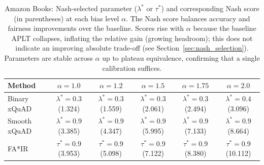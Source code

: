\begin{table}[htbp]
\centering
\caption{Amazon Books: Nash-selected parameter ($\lambda^*$ or $\tau^*$) and corresponding Nash score (in parentheses) at each bias level $\alpha$. The Nash score balances accuracy and fairness improvements over the baseline. Scores rise with $\alpha$ because the baseline APLT collapses, inflating the relative gain (growing headroom); this does not indicate an improving absolute trade-off (see Section~\ref{sec:nash_selection}). Parameters are stable across $\alpha$ up to plateau equivalence, confirming that a single calibration suffices.}
\label{tab:nash_selection_ab}
\begin{tabular}{lccccc}
\toprule
Method & $\alpha=1.0$ & $\alpha=1.2$ & $\alpha=1.5$ & $\alpha=1.75$ & $\alpha=2.0$ \\
\midrule
Binary xQuAD & $\lambda^*=0.3$ (1.324) & $\lambda^*=0.3$ (1.559) & $\lambda^*=0.3$ (2.061) & $\lambda^*=0.3$ (2.494) & $\lambda^*=0.4$ (3.096) \\
\rowcolor{gray!6} Smooth xQuAD & $\lambda^*=0.9$ (3.385) & $\lambda^*=0.9$ (4.347) & $\lambda^*=0.9$ (5.995) & $\lambda^*=0.9$ (7.133) & $\lambda^*=0.9$ (8.664) \\
FA*IR & $\tau^*=0.9$ (3.953) & $\tau^*=0.9$ (5.098) & $\tau^*=0.9$ (7.122) & $\tau^*=0.9$ (8.380) & $\tau^*=0.9$ (10.112) \\
\bottomrule
\end{tabular}
\end{table}